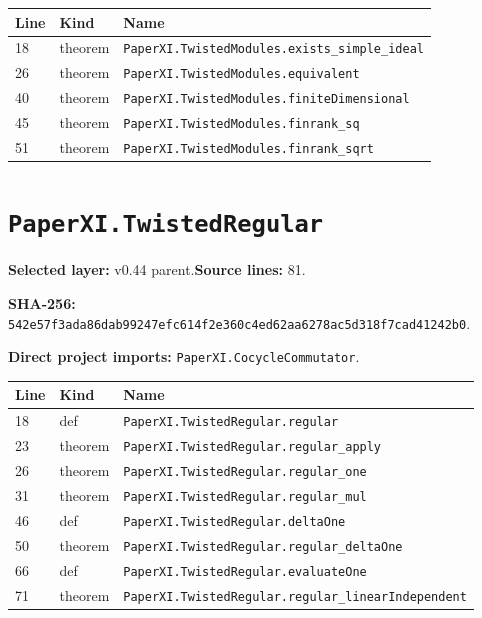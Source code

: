 \documentclass[10pt,oneside]{book}
\begin{document}
\begin{longtable}{@{}p{}p{}p{}@{}}\toprule Line&Kind&Name\\\midrule\endhead

18&theorem&\nolinkurl{PaperXI.TwistedModules.exists_simple_ideal}\\

26&theorem&\nolinkurl{PaperXI.TwistedModules.equivalent}\\

40&theorem&\nolinkurl{PaperXI.TwistedModules.finiteDimensional}\\

45&theorem&\nolinkurl{PaperXI.TwistedModules.finrank_sq}\\

51&theorem&\nolinkurl{PaperXI.TwistedModules.finrank_sqrt}\\

\bottomrule\end{longtable}

\section{\texorpdfstring{\nolinkurl{PaperXI.TwistedRegular}}{PaperXI.TwistedRegular}}\label{module:PaperXI.TwistedRegular}

\textbf{Selected layer:} v0.44 parent.\quad\textbf{Source lines:} 81.\par\textbf{SHA-256:} {\scriptsize\nolinkurl{542e57f3ada86dab99247efc614f2e360c4ed62aa6278ac5d318f7cad41242b0}}.


\textbf{Direct project imports:} \nolinkurl{PaperXI.CocycleCommutator}.

\begin{longtable}{@{}p{}p{}p{}@{}}\toprule Line&Kind&Name\\\midrule\endhead

18&def&\nolinkurl{PaperXI.TwistedRegular.regular}\\

23&theorem&\nolinkurl{PaperXI.TwistedRegular.regular_apply}\\

26&theorem&\nolinkurl{PaperXI.TwistedRegular.regular_one}\\

31&theorem&\nolinkurl{PaperXI.TwistedRegular.regular_mul}\\

46&def&\nolinkurl{PaperXI.TwistedRegular.deltaOne}\\

50&theorem&\nolinkurl{PaperXI.TwistedRegular.regular_deltaOne}\\

66&def&\nolinkurl{PaperXI.TwistedRegular.evaluateOne}\\

71&theorem&\nolinkurl{PaperXI.TwistedRegular.regular_linearIndependent}\\

\bottomrule\end{longtable}
\end{document}

